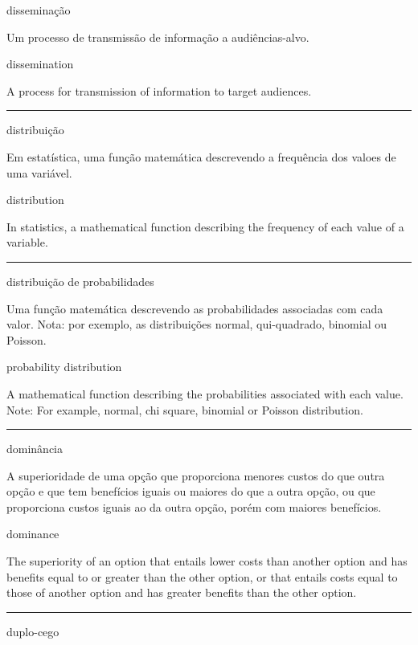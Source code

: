 \documentclass[
]{book}
\begin{document}
disseminação

Um processo de transmissão de informação a audiências-alvo.

dissemination

A process for transmission of information to target audiences.

\begin{center}\rule{0.5\linewidth}{0.5pt}\end{center}

distribuição

Em estatística, uma função matemática descrevendo a frequência dos valoes de uma variável.

distribution

In statistics, a mathematical function describing the frequency of each value of a variable.

\begin{center}\rule{0.5\linewidth}{0.5pt}\end{center}

distribuição de probabilidades

Uma função matemática descrevendo as probabilidades associadas com cada valor. Nota: por exemplo, as distribuições normal, qui-quadrado, binomial ou Poisson.

probability distribution

A mathematical function describing the probabilities associated with each value. Note: For example, normal, chi square, binomial or Poisson distribution.

\begin{center}\rule{0.5\linewidth}{0.5pt}\end{center}

dominância

A superioridade de uma opção que proporciona menores custos do que outra opção e que tem benefícios iguais ou maiores do que a outra opção, ou que proporciona custos iguais ao da outra opção, porém com maiores benefícios.

dominance

The superiority of an option that entails lower costs than another option and has benefits equal to or greater than the other option, or that entails costs equal to those of another option and has greater benefits than the other option.

\begin{center}\rule{0.5\linewidth}{0.5pt}\end{center}

duplo-cego
\end{document}
